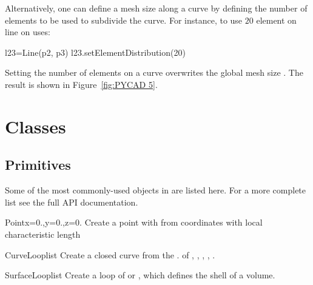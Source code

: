 Alternatively, one can define a mesh size along a curve by defining the number of elements to be used to subdivide the curve. For instance, to use $20$ element on line  on uses:
\begin{python}
l23=Line(p2, p3)
l23.setElementDistribution(20)
\end{python}
Setting the number of elements on a curve overwrites the global mesh size . The result is shown in Figure~\ref{fig:PYCAD 5}.

\section{\pycad Classes}

\subsection{Primitives}

Some of the most commonly-used objects in \pycad are listed here. For a more complete
list see the full API documentation.


\begin{classdesc}{Point}{x=0.,y=0.,z=0.}
Create a point with from coordinates with local characteristic length 
\end{classdesc}

\begin{classdesc}{CurveLoop}{list}
Create a closed curve from the . of
, , , ,
.
\end{classdesc}

\begin{classdesc}{SurfaceLoop}{list}
Create a loop of  or , which defines the shell of a volume.
\end{classdesc}


